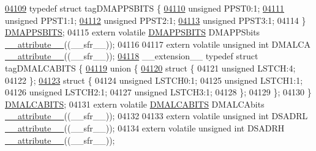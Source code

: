 \begin{DoxyCode}
\hypertarget{a00015_source_l04109}{}\hyperlink{a00014}{04109} \textcolor{keyword}{typedef} \textcolor{keyword}{struct }tagDMAPPSBITS \{
\hypertarget{a00015_source_l04110}{}\hyperlink{a00014_aae299822b7620c92a3d75906f76cee52}{04110}   \textcolor{keywordtype}{unsigned} PPST0:1;
\hypertarget{a00015_source_l04111}{}\hyperlink{a00014_a3716b700ebd3440adc899278d9b7625a}{04111}   \textcolor{keywordtype}{unsigned} PPST1:1;
\hypertarget{a00015_source_l04112}{}\hyperlink{a00014_acb64350921b2fac92cc1e8672db8b2a4}{04112}   \textcolor{keywordtype}{unsigned} PPST2:1;
\hypertarget{a00015_source_l04113}{}\hyperlink{a00014_a9db7f0ca39555bf6f18d7cd2029ff91d}{04113}   \textcolor{keywordtype}{unsigned} PPST3:1;
04114 \} \hyperlink{a00014_d0/dc5/a00435}{DMAPPSBITS};
04115 \textcolor{keyword}{extern} \textcolor{keyword}{volatile} \hyperlink{a00014_d0/dc5/a00435}{DMAPPSBITS} DMAPPSbits \hyperlink{a00015_a493c46f03454991ccc5aa7a6e1dfb2a7}{\_\_attribute\_\_}((\_\_sfr\_\_));
04116 
04117 \textcolor{keyword}{extern} \textcolor{keyword}{volatile} \textcolor{keywordtype}{unsigned} \textcolor{keywordtype}{int}  DMALCA \hyperlink{a00015_a493c46f03454991ccc5aa7a6e1dfb2a7}{\_\_attribute\_\_}((\_\_sfr\_\_));
\hypertarget{a00015_source_l04118}{}\hyperlink{a00014}{04118} \_\_extension\_\_ \textcolor{keyword}{typedef} \textcolor{keyword}{struct }tagDMALCABITS \{
\hypertarget{a00015_source_l04119}{}\hyperlink{a00015}{04119}   \textcolor{keyword}{union }\{
\hypertarget{a00015_source_l04120}{}\hyperlink{a00015}{04120}     \textcolor{keyword}{struct }\{
04121       \textcolor{keywordtype}{unsigned} LSTCH:4;
04122     \};
\hypertarget{a00015_source_l04123}{}\hyperlink{a00015}{04123}     \textcolor{keyword}{struct }\{
04124       \textcolor{keywordtype}{unsigned} LSTCH0:1;
04125       \textcolor{keywordtype}{unsigned} LSTCH1:1;
04126       \textcolor{keywordtype}{unsigned} LSTCH2:1;
04127       \textcolor{keywordtype}{unsigned} LSTCH3:1;
04128     \};
04129   \};
04130 \} \hyperlink{a00014_d9/dd5/a00432}{DMALCABITS};
04131 \textcolor{keyword}{extern} \textcolor{keyword}{volatile} \hyperlink{a00014_d9/dd5/a00432}{DMALCABITS} DMALCAbits \hyperlink{a00015_a493c46f03454991ccc5aa7a6e1dfb2a7}{\_\_attribute\_\_}((\_\_sfr\_\_));
04132 
04133 \textcolor{keyword}{extern} \textcolor{keyword}{volatile} \textcolor{keywordtype}{unsigned} \textcolor{keywordtype}{int}  DSADRL \hyperlink{a00015_a493c46f03454991ccc5aa7a6e1dfb2a7}{\_\_attribute\_\_}((\_\_sfr\_\_));
04134 \textcolor{keyword}{extern} \textcolor{keyword}{volatile} \textcolor{keywordtype}{unsigned} \textcolor{keywordtype}{int}  DSADRH \hyperlink{a00015_a493c46f03454991ccc5aa7a6e1dfb2a7}{\_\_attribute\_\_}((\_\_sfr\_\_));

\end{DoxyCode}
